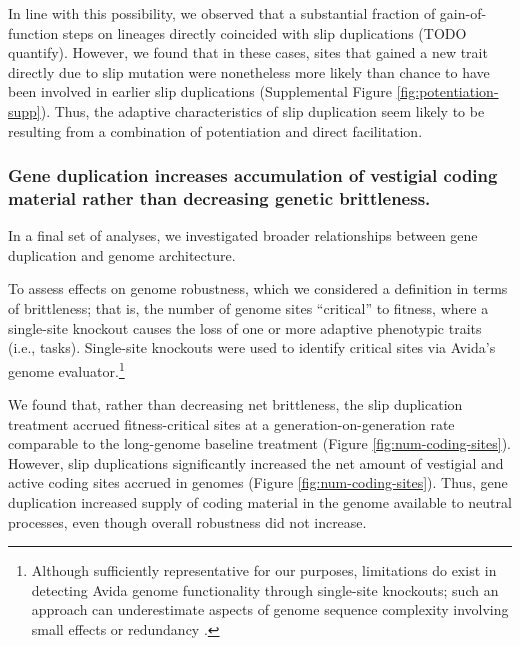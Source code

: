 In line with this possibility, we observed that a substantial fraction of gain-of-function steps on lineages directly coincided with slip duplications (TODO quantify).
However, we found that in these cases, sites that gained a new trait directly due to slip mutation were nonetheless more likely than chance to have been involved in earlier slip duplications (Supplemental Figure \ref{fig:potentiation-supp}).
Thus, the adaptive characteristics of slip duplication seem likely to be resulting from a combination of potentiation and direct facilitation.

\subsubsection{Gene duplication increases accumulation of vestigial coding material rather than decreasing genetic brittleness.}



In a final set of analyses, we investigated broader relationships between gene duplication and genome architecture.

To assess effects on genome robustness, which we considered a definition in terms of brittleness;
that is, the number of genome sites ``critical'' to fitness, where a single-site knockout causes the loss of one or more adaptive phenotypic traits (i.e., tasks).
Single-site knockouts were used to identify critical sites via Avida's genome evaluator.\footnote{%
Although sufficiently representative for our purposes, limitations do exist in detecting Avida genome functionality through single-site knockouts; such an approach can underestimate aspects of genome sequence complexity involving small effects or redundancy \citep{moreno2024cryptic}.
}

We found that, rather than decreasing net brittleness, the slip duplication treatment accrued fitness-critical sites at a generation-on-generation rate comparable to the long-genome baseline treatment (Figure \ref{fig:num-coding-sites}).
However, slip duplications significantly increased the net amount of vestigial and active coding sites accrued in genomes (Figure \ref{fig:num-coding-sites}).
Thus, gene duplication increased supply of coding material in the genome available to neutral processes, even though overall robustness did not increase.

